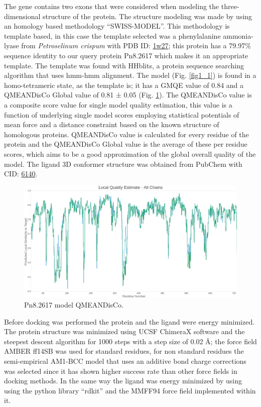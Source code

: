 \documentclass[12pt]{article}
\begin{document}
	The gene contains two exons that were considered when modeling the three-dimensional structure of the protein. The structure modeling was made by using an homology based methodology ``SWISS-MODEL''. \cite{swiss,quaternary_swiss} This methodology is template based, in this case the template selected was a phenylalanine ammonia-lyase from \textit{Petroselinum crispum} with PDB ID: \href{https://www.rcsb.org/structure/1w27}{1w27}; this protein has a 79.97\% sequence identity to our query protein Pn8.2617 which makes it an appropriate template. The template was found with HHblits, a protein sequence searching algorithm that uses hmm-hmm alignment. \cite{hhblits} The model (Fig. \ref{fig1_1}) is found in a homo-tetrameric state, as the template is; it has a GMQE value of 0.84 and a QMEANDisCo Global value of 0.81 ± 0.05 (Fig. \ref{fig1_2}). The QMEANDisCo value is a composite score value for single model quality estimation, this value is a function of underlying single model scores employing statistical potentials of mean force and a distance constraint based on the known structure of homologous proteins. QMEANDisCo value is calculated for every residue of the protein and the QMEANDisCo Global value is the average of these per residue scores, which aims to be a good approximation of the global overall quality of the model. \cite{qmeandisco_swiss} The ligand 3D conformer structure was obtained from PubChem with CID: \href{https://pubchem.ncbi.nlm.nih.gov/compound/6140}{6140}.

	
	\FloatBarrier
	\begin{figure}[h!]
		\centering
		\includegraphics[width=\textwidth-50pt]{../1/Swiss/Local_quality_estimate.png}
		\caption{\centering Pn8.2617 model QMEANDisCo.}
		\label{fig1_2}
	\end{figure}
	\FloatBarrier
	
	Before docking was performed the protein and the ligand were energy minimized. The protein structure was minimized using UCSF ChimeraX software \cite{chimera,chimera_2} and the steepest descent algorithm for 1000 steps with a step size of 0.02 \r{A}; the force field AMBER ff14SB was used for standard residues, for non standard residues the semi-empirical AM1-BCC model that uses an additive bond charge corrections was selected since it has shown higher success rate than other force fields in docking methods. \cite{am1_bcc,am1_bcc_2,am1_bcc_3} In the same way the ligand was energy minimized by using using the python library ``rdkit'' and the MMFF94 force field implemented within it. \cite{rdkit,rdkit_mmff}
	
\end{document}
